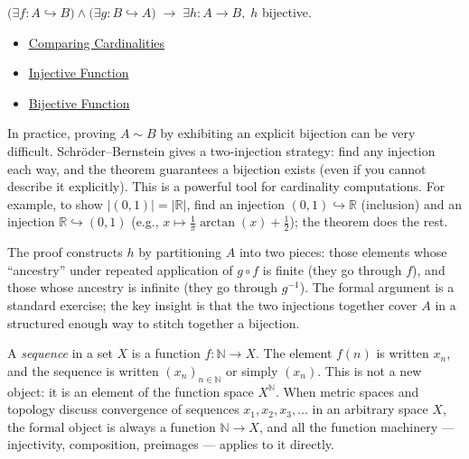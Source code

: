 \begin{remark*}
$\bigl(\exists f: A\hookrightarrow B\bigr) \wedge \bigl(\exists g: B\hookrightarrow A\bigr) \;\to\; \exists h: A\to B,\; h$ bijective.
\end{remark*}


\begin{dependencies}
\begin{itemize}
  \item \hyperref[def:cardinality-order]{Comparing Cardinalities}
  \item \hyperref[def:injective]{Injective Function}
  \item \hyperref[def:bijective]{Bijective Function}
\end{itemize}
\end{dependencies}

\begin{remark*}
In practice, proving $A \sim B$ by exhibiting an explicit bijection can be
very difficult. Schr\"{o}der--Bernstein gives a two-injection strategy: find any
injection each way, and the theorem guarantees a bijection exists (even if
you cannot describe it explicitly). This is a powerful tool for cardinality
computations. For example, to show $|(0,1)| = |\mathbb{R}|$, find an
injection $(0,1) \hookrightarrow \mathbb{R}$ (inclusion) and an injection
$\mathbb{R} \hookrightarrow (0,1)$ (e.g., $x \mapsto \frac{1}{\pi}
\arctan(x) + \frac{1}{2}$); the theorem does the rest.
\end{remark*}

\begin{remark*}
The proof constructs $h$ by partitioning $A$ into two pieces: those elements
whose ``ancestry'' under repeated application of $g \circ f$ is finite (they
go through $f$), and those whose ancestry is infinite (they go through
$g^{-1}$). The formal argument is a standard exercise; the key insight is that
the two injections together cover $A$ in a structured enough way to stitch
together a bijection.
\end{remark*}

\begin{remark*}
\label{rem:sequences-as-functions}
A \emph{sequence} in a set $X$ is a function $f : \mathbb{N} \to X$. The
element $f(n)$ is written $x_n$, and the sequence is written $(x_n)_{n \in
\mathbb{N}}$ or simply $(x_n)$. This is not a new object: it is an element
of the function space $X^{\mathbb{N}}$. When metric spaces and topology
discuss convergence of sequences $x_1, x_2, x_3, \dots$ in an arbitrary space
$X$, the formal object is always a function $\mathbb{N} \to X$, and all the
function machinery --- injectivity, composition, preimages --- applies to it
directly.
\end{remark*}

